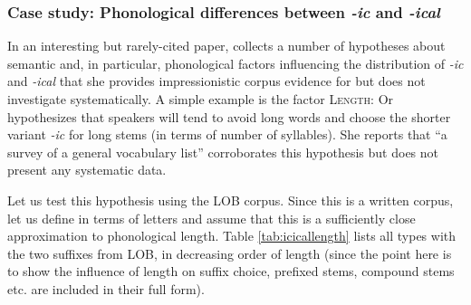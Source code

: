 \subsubsection{Case study: Phonological differences between \textit{-ic} and \textit{-ical}}
\label{sec:phonologicaldifferencesbetweenicandical}

In an interesting but rarely-cited paper, \citet{or_corpus-based_1994} collects a number of hypotheses about semantic and, in particular, phonological factors influencing the distribution of \textit{-ic} and \textit{-ical} that she provides impressionistic corpus evidence for but does not investigate systematically. A simple example is the factor \textsc{Length}: Or hypothesizes that speakers will tend to avoid long words and choose the shorter variant \textit{-ic} for long stems (in terms of number of syllables). She reports that ``a survey of a general vocabulary list'' corroborates this hypothesis but does not present any systematic data.

Let us test this hypothesis using the LOB corpus. Since this is a written corpus, let us define  in terms of letters and assume that this is a sufficiently close approximation to phonological length. Table \ref{tab:icicallength} lists all types with the two suffixes from LOB, in decreasing order of length (since the point here is to show the influence of length on suffix choice, prefixed stems, compound stems etc. are included in their full form).

